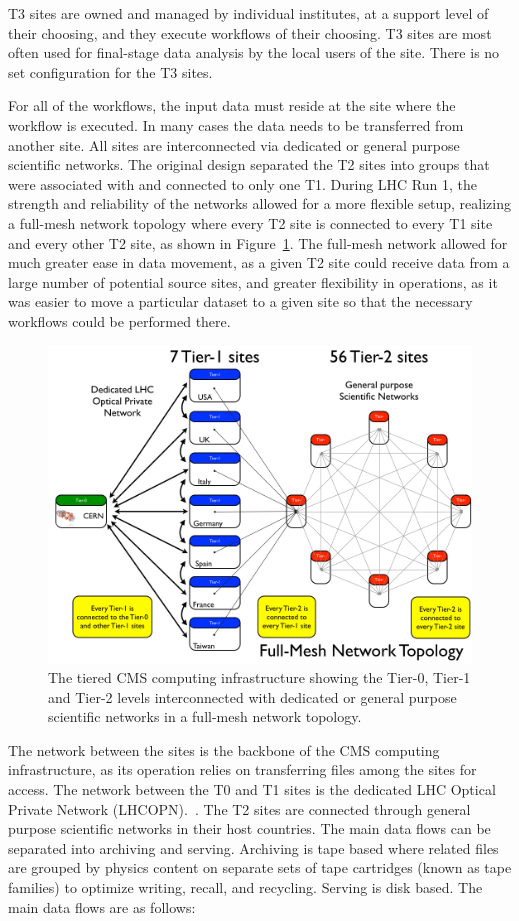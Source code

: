 T3 sites are owned and managed by individual institutes, at a support level
of their choosing, and they execute workflows of their choosing.  T3 sites
are most often used for final-stage data analysis by the local users of the
site.  There is no set configuration for the T3 sites.

For all of the workflows, the input data must reside at the site where the
workflow is executed.  In many cases the data needs to be transferred from
another site.  All sites are interconnected via dedicated or general
purpose scientific networks. The original design separated the T2 sites
into groups that were associated with and connected to only one T1. During
LHC Run 1, the strength and reliability of the networks allowed for a more
flexible setup, realizing a full-mesh network topology where every T2 site
is connected to every T1 site and every other T2 site, as shown in
Figure~\ref{fig:distributed_topology}.  The full-mesh network allowed for
much greater ease in data movement, as a given T2 site could receive data
from a large number of potential source sites, and greater flexibility in
operations, as it was easier to move a particular dataset to a given site
so that the necessary workflows could be performed there.

\begin{figure}
\begin{center}
\includegraphics[width=.5\textwidth]{figs/distributed_topology}
\end{center}
\caption{The tiered CMS computing infrastructure showing the Tier-0, Tier-1 and Tier-2 levels interconnected with dedicated or general purpose scientific networks in a full-mesh network topology.
  \label{fig:distributed_topology}}
\end{figure}

The network between the sites is the backbone of the CMS computing
infrastructure, as its operation relies on transferring files among the
sites for access. The network between the T0 and T1 sites is the dedicated
LHC Optical Private Network (LHCOPN).~. The T2 sites are connected through general purpose
scientific networks in their host countries. The main data flows can be
separated into archiving and serving. Archiving is tape based where related
files are grouped by physics content on separate sets of tape cartridges
(known as tape families) to optimize writing, recall, and
recycling. Serving is disk based. The main data flows are as follows:

